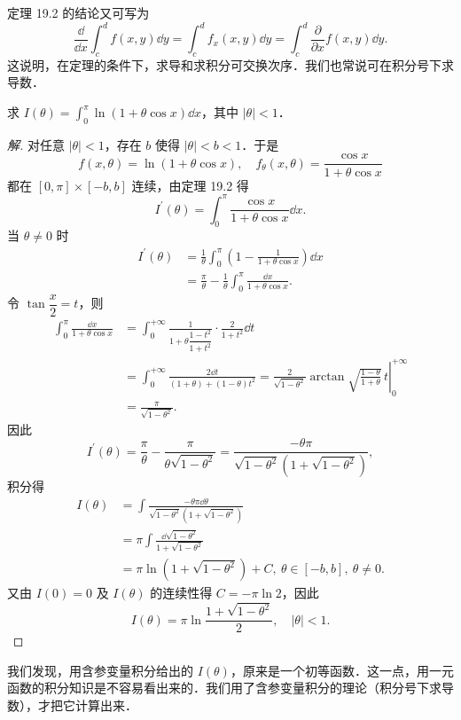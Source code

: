 定理 19.2 的结论又可写为
\[
\frac{\dd}{\dd x}\int_{c}^{d}f(x,y)\dd y=\int_{c}^{d}f_{x}(x,y)\dd y=\int_{c}^{d}\frac{\partial}{\partial x}f(x,y)\dd y.
\]
这说明，在定理的条件下，求导和求积分可交换次序．我们也常说可在积分号下求导数．

\begin{example}\label{ex:19-1-1}
求 $I(\theta)=\int_{0}^{\pi}\ln(1+\theta\cos x)\dd x$，其中 $|\theta|<1$．
\end{example}

\begin{proof}[解]
对任意 $|\theta|<1$，存在 $b$ 使得 $|\theta|<b<1$．于是
\[
f(x,\theta)=\ln(1+\theta\cos x),\quad f_{\theta}(x,\theta)=\frac{\cos x}{1+\theta\cos x}
\]
都在 $[0,\pi]\times[-b,b]$ 连续，由定理 19.2 得
\[
I^{\prime}(\theta)=\int_{0}^{\pi}\frac{\cos x}{1+\theta\cos x}\dd x.
\]
当 $\theta\neq 0$ 时
\[
\begin{aligned}
I^{\prime}(\theta)&=\frac{1}{\theta}\int_{0}^{\pi}\left(1-\frac{1}{1+\theta\cos x}\right)\dd x\\
&=\frac{\pi}{\theta}-\frac{1}{\theta}\int_{0}^{\pi}\frac{\dd x}{1+\theta\cos x}.
\end{aligned}
\]
令 $\tan\dfrac{x}{2}=t$，则
\[
\begin{aligned}
\int_{0}^{\pi}\frac{\dd x}{1+\theta\cos x}&=\int_{0}^{+\infty}\frac{1}{1+\theta\dfrac{1-t^{2}}{1+t^{2}}}\cdot\frac{2}{1+t^{2}}\dd t\\
&=\int_{0}^{+\infty}\frac{2\dd t}{(1+\theta)+(1-\theta)t^{2}}=\left.\frac{2}{\sqrt{1-\theta^{2}}}\arctan\sqrt{\frac{1-\theta}{1+\theta}}\,t\right|_{0}^{+\infty}\\
&=\frac{\pi}{\sqrt{1-\theta^{2}}}.
\end{aligned}
\]
因此
\[
I^{\prime}(\theta)=\frac{\pi}{\theta}-\frac{\pi}{\theta\sqrt{1-\theta^{2}}}=\frac{-\theta\pi}{\sqrt{1-\theta^{2}}\left(1+\sqrt{1-\theta^{2}}\right)},
\]
积分得
\[
\begin{aligned}
I(\theta)&=\int\frac{-\theta\pi\dd\theta}{\sqrt{1-\theta^{2}}\left(1+\sqrt{1-\theta^{2}}\right)}\\
&=\pi\int\frac{\dd\sqrt{1-\theta^{2}}}{1+\sqrt{1-\theta^{2}}}\\
&=\pi\ln\left(1+\sqrt{1-\theta^{2}}\right)+C,\ \theta\in[-b,b],\ \theta\neq 0.
\end{aligned}
\]
又由 $I(0)=0$ 及 $I(\theta)$ 的连续性得 $C=-\pi\ln 2$，因此
\[
I(\theta)=\pi\ln\frac{1+\sqrt{1-\theta^{2}}}{2},\quad|\theta|<1.
\]
\end{proof}

我们发现，用含参变量积分给出的 $I(\theta)$，原来是一个初等函数．这一点，用一元函数的积分知识是不容易看出来的．我们用了含参变量积分的理论（积分号下求导数），才把它计算出来．

